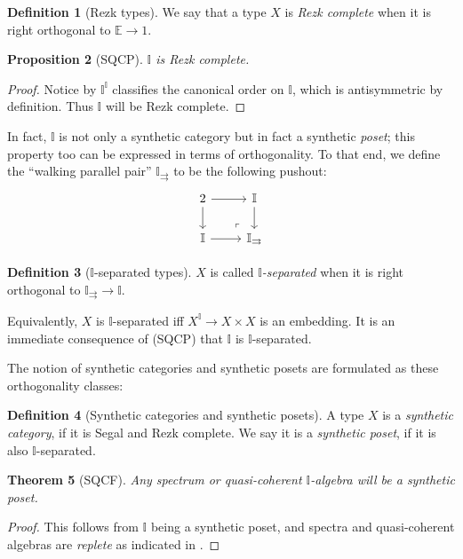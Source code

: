 \documentclass[a4paper,12pt]{amsart}
\newtheorem{theorem}{Theorem}[section]
\newtheorem{proposition}[theorem]{Proposition}
\theoremstyle{definition}
\newtheorem{definition}[theorem]{Definition}
\newcommand{\mbb}[1]{\mathbb{#1}}
\newcommand{\I}{\mbb I}
\begin{document}
\begin{definition}[Rezk types]
  We say that a type $X$ is \emph{Rezk complete} when it is right orthogonal to $\mbb E \to 1$.
\end{definition}

\begin{proposition}[SQCP]
  $\I$ is Rezk complete.
\end{proposition}
\begin{proof}
  Notice by  $\I^\I$ classifies the canonical order on $\I$, which is antisymmetric by definition. Thus $\I$ will be Rezk complete.
\end{proof}

In fact, $\I$ is not only a synthetic category but in fact a synthetic \emph{poset}; this property too can be expressed in terms of orthogonality. To that end, we define the ``walking parallel pair'' $\I_{\rightrightarrows}$ to be the following pushout:
\[
\begin{tikzcd}
  2 \ar[r] \ar[d] & \I \ar[d] \\ 
  \I \ar[r] & \I_{\rightrightarrows}
  \arrow["\lrcorner"{anchor=center, pos=0.125, rotate=180}, draw=none, from=2-2, to=1-1]
\end{tikzcd}
\]

\begin{definition}[$\I$-separated types]
  $X$ is called \emph{$\I$-separated} when it is right orthogonal to $\I_{\rightrightarrows} \to \I$.
\end{definition}

Equivalently, $X$ is $\I$-separated iff $X^\I \to X \times X$ is an embedding. It is an immediate consequence of (SQCP) that $\I$ is $\I$-separated.

The notion of synthetic categories and synthetic posets are formulated as these orthogonality classes:

\begin{definition}[Synthetic categories and synthetic posets]
  A type $X$ is a \emph{synthetic category}, if it is Segal and Rezk complete. We say it is a \emph{synthetic poset}, if it is also $\I$-separated.
\end{definition}

\begin{theorem}[SQCF]\label{thm:affineposet}
  Any spectrum or quasi-coherent $\I$-algebra will be a synthetic poset.
\end{theorem}
\begin{proof}
  This follows from $\I$ being a synthetic poset, and spectra and quasi-coherent algebras are \emph{replete} as indicated in .
\end{proof}
\end{document}
